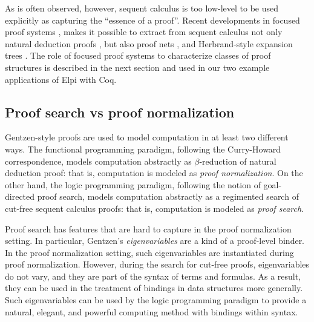 
As is often observed, however, sequent calculus is too low-level to be
used explicitly as capturing the ``essence of a proof''.  Recent
developments in focused proof systems \cite{andreoli92jlc,liang09tcs},
makes it possible to extract from sequent calculus not only natural
deduction proofs \cite{pimentel16lsfa}, but also proof nets
\cite{chaudhuri08tcs}, and Herbrand-style expansion trees
\cite{chaudhuri16jlc}.  The role of focused proof systems to
characterize classes of proof structures is described in the next
section and used in our two example applications of Elpi with Coq.



\subsection{Proof search vs proof normalization}

Gentzen-style proofs are used to model computation in at least two
different ways.  The functional programming paradigm, following the
Curry-Howard correspondence, models computation abstractly as 
$\beta$-reduction of natural deduction proof: that is, computation is
modeled as \emph{proof normalization}.  On the other hand, the
logic programming paradigm, following the notion of goal-directed
proof search, models computation abstractly as a regimented search of
cut-free sequent calculus proofs: that is, computation is modeled
as \emph{proof search}.

Proof search has features that are hard to capture in the proof
normalization setting.  In particular, Gentzen's \emph{eigenvariables}
are a kind of a proof-level binder.  In the proof normalization
setting, such eigenvariables are instantiated during proof
normalization.  However, during the search for cut-free proofs,
eigenvariables do not vary, and they are part of the syntax of terms
and formulas.  As a result, they can be used in the treatment of
bindings in data structures more generally.  Such eigenvariables can
be used by the logic programming paradigm to provide a natural,
elegant, and powerful computing method with bindings within syntax.

